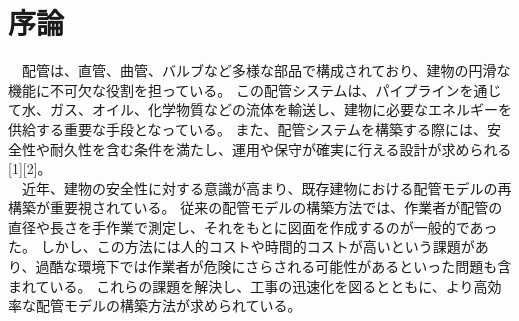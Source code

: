 \chapter{序論}
　配管は、直管、曲管、バルブなど多様な部品で構成されており、建物の円滑な機能に不可欠な役割を担っている。
この配管システムは、パイプラインを通じて水、ガス、オイル、化学物質などの流体を輸送し、建物に必要なエネルギーを供給する重要な手段となっている。
また、配管システムを構築する際には、安全性や耐久性を含む条件を満たし、運用や保守が確実に行える設計が求められる[1][2]。\\
　近年、建物の安全性に対する意識が高まり、既存建物における配管モデルの再構築が重要視されている。
従来の配管モデルの構築方法では、作業者が配管の直径や長さを手作業で測定し、それをもとに図面を作成するのが一般的であった。
しかし、この方法には人的コストや時間的コストが高いという課題があり、過酷な環境下では作業者が危険にさらされる可能性があるといった問題も含まれている。
これらの課題を解決し、工事の迅速化を図るとともに、より高効率な配管モデルの構築方法が求められている。

